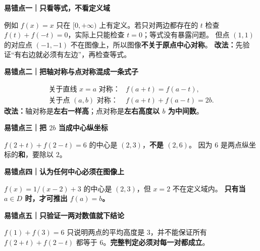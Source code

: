 \clearpage
\begin{trapbox}
\textbf{\textcolor{CTrap}{易错点一｜只看等式，不看定义域}}



例如 $f(x)=x$ 只在 $[0,+\infty)$ 上有定义。若只对两边都存在的 $t$ 检查
$f(t)+f(-t)=0$，实际上只能检查 $t=0$；等式没有暴露问题。
但点 $(1,1)$ 的对应点 $(-1,-1)$ 不在图像上，所以图像\textbf{不关于原点中心对称}。
\textbf{改法：}先验证“有右边就必须有左边”，再检查等式。

\medskip

\end{trapbox}
\clearpage
\begin{trapbox}
\textbf{\textcolor{CTrap}{易错点二｜把轴对称与点对称混成一条式子}}


\[
\begin{array}{ll}
\text{关于直线 }x=a\text{ 对称：}& f(a+t)=f(a-t),\\[3pt]
\text{关于点 }(a,b)\text{ 对称：}& f(a+t)+f(a-t)=2b.
\end{array}
\]
\textbf{改法：}轴对称是\textbf{左右一样高}；点对称是\textbf{左右高度以 $b$ 为中间数}。

\medskip

\end{trapbox}
\clearpage
\begin{trapbox}
\textbf{\textcolor{CTrap}{易错点三｜把 $2b$ 当成中心纵坐标}}


$f(2+t)+f(2-t)=6$ 的中心是 $(2,3)$，\textbf{不是 $(2,6)$}。
因为 $6$ 是两点纵坐标的\textbf{和}，要除以 $2$。

\medskip

\end{trapbox}
\clearpage
\begin{trapbox}
\textbf{\textcolor{CTrap}{易错点四｜认为任何中心必须在图像上}}


$f(x)=1/(x-2)+3$ 的中心是 $(2,3)$，但 $x=2$ 不在定义域内。
\textbf{只有当 $a\in D$ 时，才可推出 $f(a)=b$。}

\medskip

\end{trapbox}
\clearpage
\begin{trapbox}
\textbf{\textcolor{CTrap}{易错点五｜只验证一两对数值就下结论}}


$f(1)+f(3)=6$ 只说明两点的平均高度是 $3$，并不能保证所有
$f(2+t)+f(2-t)$ 都等于 $6$。\textbf{完整判定必须对每一对都成立}。

\medskip

\end{trapbox}
